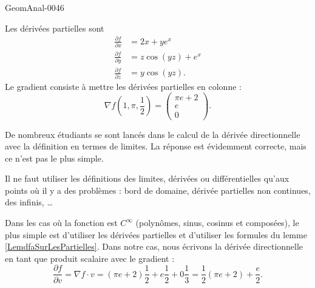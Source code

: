 \begin{corrige}{GeomAnal-0046}

    Les dérivées partielles sont
    \begin{subequations}
        \begin{align}
            \frac{ \partial f }{ \partial x }&=2x+y e^{x}\\
            \frac{ \partial f }{ \partial y }&=z\cos(yz)+e^x\\
            \frac{ \partial f }{ \partial z }&=y\cos(yz).
        \end{align}
    \end{subequations}
    Le gradient consiste à mettre les dérivées partielles en colonne :
    \begin{equation}
        \nabla f(1,\pi,\frac{ 1 }{2})=\begin{pmatrix}
            \pi e+2    \\ 
            e    \\ 
            0    
        \end{pmatrix}.
    \end{equation}

    De nombreux étudiants se sont lancés dans le calcul de la dérivée directionnelle avec la définition en termes de limites. La réponse est évidemment correcte, mais ce n'est pas le plus simple.

        Il ne faut utiliser les définitions des limites, dérivées ou différentielles qu'aux points où il y a des problèmes : bord de domaine, dérivée partielles non continues, des infinis, \ldots

        Dans les cas où la fonction est $C^{\infty}$ (polynômes, sinus, cosinus et composées), le plus simple est d'utiliser les dérivées partielles et d'utiliser les formules du lemme \ref{LemdfaSurLesPartielles}. Dans notre cas, nous écrivons la dérivée directionnelle en tant que produit scalaire avec le gradient :
        \begin{equation}
            \frac{ \partial f }{ \partial v }=\nabla f\cdot v=(\pi e+2)\frac{ 1 }{2}+e\frac{ 1 }{2}+0\frac{1}{ 3 }=\frac{ 1 }{2}(\pi e+2)+\frac{ e }{2}.
        \end{equation}


\end{corrige}
